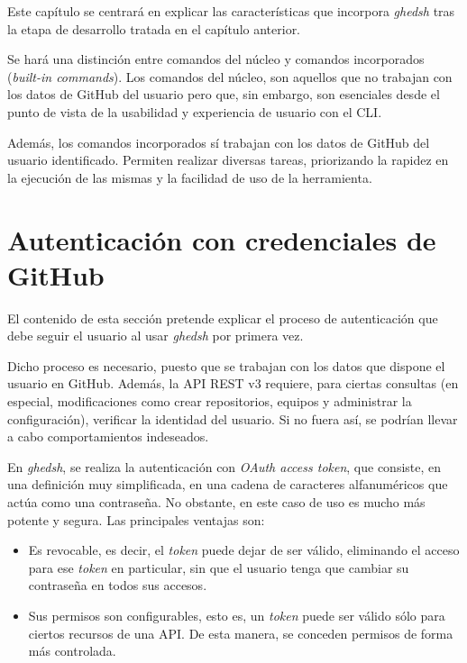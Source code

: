 
Este capítulo se centrará en explicar las características que incorpora {\it ghedsh} tras la etapa de desarrollo tratada en el capítulo anterior.
\bigskip

Se hará una distinción entre comandos del núcleo y comandos incorporados ({\it built-in commands}). Los comandos del núcleo, son aquellos que no trabajan con los datos de GitHub del usuario pero que, sin embargo, son
esenciales desde el punto de vista de la usabilidad y experiencia de usuario con el CLI.
\bigskip

Además, los comandos incorporados sí trabajan con los datos de GitHub del usuario identificado. Permiten realizar diversas tareas, priorizando la rapidez en la ejecución de las mismas y la facilidad de uso de la herramienta.

\section{Autenticación con credenciales de GitHub}
\label{3:sec:1}

El contenido de esta sección pretende explicar el proceso de autenticación que debe seguir el usuario al usar {\it ghedsh} por primera vez.
\bigskip

Dicho proceso es necesario, puesto que se trabajan con los datos que dispone el usuario en GitHub. Además, la API REST v3 requiere, para ciertas consultas (en especial, modificaciones como crear repositorios, equipos y administrar la configuración), verificar la identidad del usuario. Si no fuera así, se podrían llevar a cabo comportamientos indeseados.
\bigskip

En {\it ghedsh}, se realiza la autenticación con {\it OAuth access token}\cite{B16}, que consiste, en una definición muy simplificada, en una cadena de caracteres alfanuméricos que actúa como una contraseña. No obstante,
en este caso de uso es mucho más potente y segura. Las principales ventajas son:
\begin{itemize}
	\item Es revocable, es decir, el {\it token} puede dejar de ser válido, eliminando el acceso para ese {\it token} en particular, sin que el usuario tenga que cambiar su contraseña en todos sus accesos.
	\item Sus permisos son configurables, esto es, un {\it token} puede ser válido sólo para ciertos recursos de una API. De esta manera, se conceden permisos de forma más controlada.
\end{itemize}

